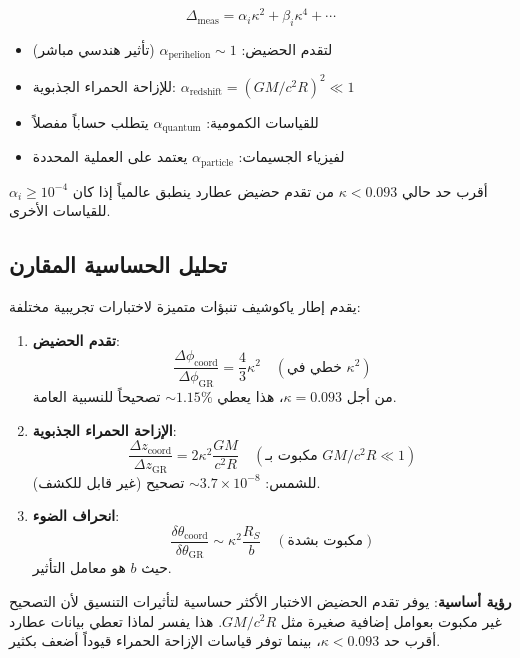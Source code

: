 \documentclass[11pt,a4paper]{article}
\begin{document}
	\begin{equation}
		\Delta_{\text{meas}} = \alpha_i \kappa^2 + \beta_i \kappa^4 + \cdots
	\end{equation}
	
	\begin{itemize}
		\item لتقدم الحضيض: $\alpha_{\text{perihelion}} \sim 1$ (تأثير هندسي مباشر)
		\item للإزاحة الحمراء الجذبوية: $\alpha_{\text{redshift}} = (GM/c^2R)^2 \ll 1$
		\item للقياسات الكمومية: $\alpha_{\text{quantum}}$ يتطلب حساباً مفصلاً
		\item لفيزياء الجسيمات: $\alpha_{\text{particle}}$ يعتمد على العملية المحددة
	\end{itemize}
	
	أقرب حد حالي $\kappa < 0.093$ من تقدم حضيض عطارد ينطبق عالمياً إذا كان $\alpha_i \geq 10^{-4}$ للقياسات الأخرى.
	
	\subsection{تحليل الحساسية المقارن}
	\label{subsec:comparative-sensitivity}
	
	يقدم إطار ياكوشيف تنبؤات متميزة لاختبارات تجريبية مختلفة:
	
	\begin{enumerate}
		\item \textbf{تقدم الحضيض}: 
		\[
		\frac{\Delta\phi_{\text{coord}}}{\Delta\phi_{\text{GR}}} = \frac{4}{3}\kappa^2 \quad (\text{خطي في }\kappa^2)
		\]
		من أجل $\kappa = 0.093$، هذا يعطي $\sim 1.15\%$ تصحيحاً للنسبية العامة.
		
		\item \textbf{الإزاحة الحمراء الجذبوية}:
		\[
		\frac{\Delta z_{\text{coord}}}{\Delta z_{\text{GR}}} = 2\kappa^2 \frac{GM}{c^2R} \quad (\text{مكبوت بـ }GM/c^2R \ll 1)
		\]
		للشمس: $\sim 3.7\times10^{-8}$ تصحيح (غير قابل للكشف).
		
		\item \textbf{انحراف الضوء}:
		\[
		\frac{\delta\theta_{\text{coord}}}{\delta\theta_{\text{GR}}} \sim \kappa^2 \frac{R_S}{b} \quad (\text{مكبوت بشدة})
		\]
		حيث $b$ هو معامل التأثير.
	\end{enumerate}
	
	\textbf{رؤية أساسية}: يوفر تقدم الحضيض الاختبار الأكثر حساسية لتأثيرات التنسيق لأن التصحيح غير مكبوت بعوامل إضافية صغيرة مثل $GM/c^2R$. هذا يفسر لماذا تعطي بيانات عطارد أقرب حد $\kappa < 0.093$، بينما توفر قياسات الإزاحة الحمراء قيوداً أضعف بكثير.
	
\end{document}
